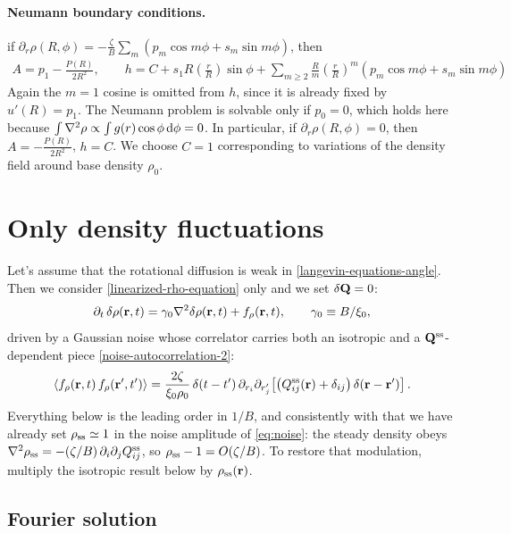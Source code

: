 \documentclass[a5paper]{article}
\begin{document}
\paragraph{Neumann boundary conditions.}
if $\partial_r \rho(R,\phi) =  -\frac{\zeta}{B}\sum_m \left(p_m \cos m\phi + s_m \sin m\phi\right)$, then
\begin{align} 
    A = p_1 - \frac{P(R)}{2R^2},
    \qquad
    h= C + s_1 R \left(\frac{r}{R}\right)\sin\phi + \sum_{m \geq 2}
    \frac{R}{m}\left(\frac{r}{R}\right)^m \left(p_m \cos m\phi + s_m \sin m\phi\right)
\end{align}
Again the $m=1$ cosine is omitted from $h$, since it is already fixed by $u'(R) = p_1$. The Neumann problem is solvable only if $p_0 = 0$, which holds here because $\int \nabla^2\rho \propto \int g(r)\cos\phi\,\d\phi = 0$.
In particular, if $\partial_r \rho(R,\phi) = 0$, then $A = -\frac{P(R)}{2R^2}$, $h=C$.
We choose $C=1$ corresponding to variations of the density field around base density $\rho_0$.

\section{Only density fluctuations}
\label{sec-rho-only}
Let's assume that the rotational diffusion is weak in \cref{langevin-equations-angle}. Then we consider \cref{linearized-rho-equation} only and we set $\delta \Q = 0$:
\begin{equation}
    \label{eq:sde}
    \partial_t\,\delta\rho(\r,t) = \gamma_0\nabla^2\delta\rho(\r,t) + f_\rho(\r,t),\qquad \gamma_0 \equiv B/\xi_0,
\end{equation}
driven by a Gaussian noise whose correlator carries both an isotropic and a $\Q^\ss$-dependent piece \eqref{noise-autocorrelation-2}:
\begin{equation}
    \label{eq:noise}
    \la f_\rho(\r,t)\,f_\rho(\r',t')\ra = \frac{2\zeta}{\xi_0\rho_0}\,\delta(t-t')\,\partial_{r_i}\partial_{r'_j}\!\left[\bigl(Q^\ss_{ij}(\r) + \delta_{ij}\bigr)\,\delta(\r-\r')\right].
\end{equation}
Everything below is the leading order in $1/B$, and consistently with that we have already set $\rho_\ss\simeq1$ in the noise amplitude of \eqref{eq:noise}: the steady density obeys $\nabla^2\rho_\ss = -(\zeta/B)\,\partial_i\partial_jQ^\ss_{ij}$, so $\rho_\ss-1 = O(\zeta/B)$. To restore that modulation, multiply the isotropic result below by $\rho_\ss(\r)$.
 
\subsection{Fourier solution}
\label{sec-fourier}
\end{document}
